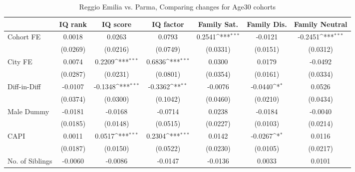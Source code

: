 \begin{table}[htbp]\centering
\def\sym#1{\ifmmode^{#1}\else\(^{#1}\)\fi}
\caption{Reggio Emilia vs. Parma, Comparing changes for Age30 cohorts}
\begin{tabular}{l*{6}{c}}
\toprule
            &\multicolumn{1}{c}{IQ rank}&\multicolumn{1}{c}{IQ score}&\multicolumn{1}{c}{IQ factor}&\multicolumn{1}{c}{Family Sat.}&\multicolumn{1}{c}{Family Dis.}&\multicolumn{1}{c}{Family Neutral}\\
\midrule
Cohort FE   &      0.0018         &      0.0263         &      0.0793         &      0.2541\sym{***}&     -0.0121         &     -0.2451\sym{***}\\
            &    (0.0269)         &    (0.0216)         &    (0.0749)         &    (0.0331)         &    (0.0151)         &    (0.0312)         \\
\addlinespace
City FE     &      0.0074         &      0.2209\sym{***}&      0.6836\sym{***}&      0.0300         &      0.0179         &     -0.0492         \\
            &    (0.0287)         &    (0.0231)         &    (0.0801)         &    (0.0354)         &    (0.0161)         &    (0.0334)         \\
\addlinespace
Diff-in-Diff&     -0.0107         &     -0.1348\sym{***}&     -0.3362\sym{**} &     -0.0076         &     -0.0440\sym{*}  &      0.0526         \\
            &    (0.0374)         &    (0.0300)         &    (0.1042)         &    (0.0460)         &    (0.0210)         &    (0.0434)         \\
\addlinespace
Male Dummy  &     -0.0181         &     -0.0168         &     -0.0714         &      0.0238         &     -0.0184         &     -0.0040         \\
            &    (0.0185)         &    (0.0148)         &    (0.0515)         &    (0.0227)         &    (0.0103)         &    (0.0214)         \\
\addlinespace
CAPI        &      0.0011         &      0.0517\sym{***}&      0.2304\sym{***}&      0.0142         &     -0.0267\sym{*}  &      0.0116         \\
            &    (0.0187)         &    (0.0150)         &    (0.0522)         &    (0.0230)         &    (0.0105)         &    (0.0217)         \\
\addlinespace
No. of Siblings&     -0.0060         &     -0.0086         &     -0.0147         &     -0.0136         &      0.0033         &      0.0101         \\

\end{tabular}
\end{table}
